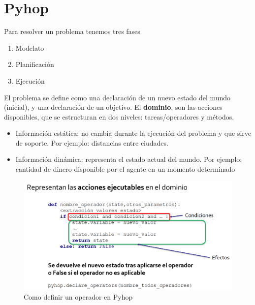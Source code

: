 \chapter{Pyhop}

Para resolver un problema tenemos tres fases
\begin{enumerate}
   \item Modelato
   \item Planificación
   \item Ejecución
\end{enumerate}

El problema se define como una declaración de un nuevo estado del mundo (inicial), y una declaración de un objetivo.
El \textbf{dominio}, son las acciones disponibles, que se estructuran en dos niveles: tareas/operadores y métodos.


\begin{itemize}
	\item Información estática: no cambia durante la ejecución del
problema y que sirve de soporte. Por ejemplo: distancias
entre ciudades.
	\item Información dinámica: representa el estado actual del
mundo. Por ejemplo: cantidad de dinero disponible por el
agente en un momento determinado
\end{itemize}

\begin{figure}[htbp]
   \centering
   \includegraphics{images/03/operador.png}
   \caption{Como definir un operador en Pyhop}
   \label{fig:03/operador}
\end{figure}


